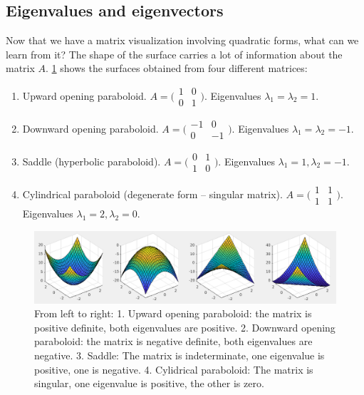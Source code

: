 \documentclass[onefignum,onetabnum]{siamart190516}
\begin{document}
\subsection{Eigenvalues and eigenvectors}
Now that we have a matrix visualization involving quadratic forms, what
can we learn from it?  
The shape of the surface carries a lot of information about the matrix $A$.
\cref{fig:QuadraticFormFixedSurfaces} shows the surfaces obtained from four
different matrices:
\begin{enumerate}
	\item Upward opening paraboloid.  $A = \bigl( \begin{smallmatrix} 1 & 0 \\ 0 & 1 \end{smallmatrix}\bigr)$.  Eigenvalues $\lambda_1 = \lambda_2 = 1$.
	\item Downward opening paraboloid.  $A = \bigl( \begin{smallmatrix} -1 & 0 \\ 0 & -1 \end{smallmatrix}\bigr)$.  Eigenvalues $\lambda_1 = \lambda_2 = -1$.
	\item Saddle (hyperbolic paraboloid). $A = \bigl( \begin{smallmatrix} 0 & 1 \\ 1 & 0 \end{smallmatrix}\bigr)$.  Eigenvalues $\lambda_1 = 1, \lambda_2 = -1$.
	\item Cylindrical paraboloid (degenerate form -- singular matrix). $A = \bigl( \begin{smallmatrix}  1 & 1 \\ 1 & 1 \end{smallmatrix}\bigr)$.  Eigenvalues $\lambda_1 = 2, \lambda_2 = 0$.
\end{enumerate}
\begin{figure}[thb]
	\centering
	\includegraphics[width=1.0\columnwidth]{QuadraticFormFixedSurfaces.png}
	\caption{From left to right:  1. Upward opening paraboloid: the matrix is positive definite, 
		both eigenvalues are positive.  2. Downward opening paraboloid: the matrix is
		negative definite, both eigenvalues are negative.  3. Saddle:  The matrix is indeterminate,
		one eigenvalue is positive, one is negative.  4. Cylidrical paraboloid: The matrix is
		singular, one eigenvalue is positive, the other is zero.}
	\label{fig:QuadraticFormFixedSurfaces}
\end{figure}
\end{document}
